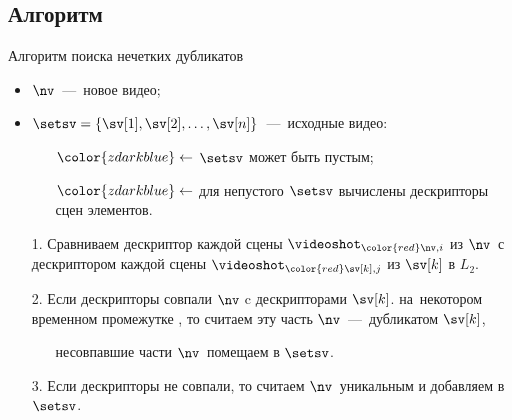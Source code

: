 
\subsection{Алгоритм}

\begin{frame}{Алгоритм поиска нечетких дубликатов}
    \begin{itemize} \footnotesize
        \item $\nv$\ ---~новое видео;
        \item $\setsv = \{\sv[1], \sv[2], \dots, \sv[n]\}$\ ---~исходные видео:
            \begin{itemize}
                \item[${\color{zdarkblue}\leftarrow}$]
                    {\scriptsize  $\setsv$ может быть пустым};
                \item[${\color{zdarkblue}\leftarrow}$]
                    {\scriptsize для непустого $\setsv$
                        вычислены дескрипторы сцен элементов.}
            \end{itemize}
        \item[1.] Сравниваем дескриптор каждой
            сцены $\videoshot_{\color{red}\nv,i}$ из $\nv$\
            с дескриптором каждой сцены
            $\videoshot_{\color{red}\sv[k],j}$ из $\sv[k]$ в $L_2$.
        \item[2.] Если дескрипторы совпали $\nv$ c дескрипторами $\sv[k]$.
            на~некотором временном промежутке ,
            то считаем эту часть $\nv$\ ---~дубликатом $\sv[k]$,
            \begin{itemize}
                \item[] {\scriptsize несовпавшие
                    части $\nv$\ помещаем в $\setsv$}.
            \end{itemize}
        \item[3.] Если дескрипторы не совпали, то считаем $\nv$\ уникальным и
            добавляем в $\setsv$.
    \end{itemize}
\end{frame}
